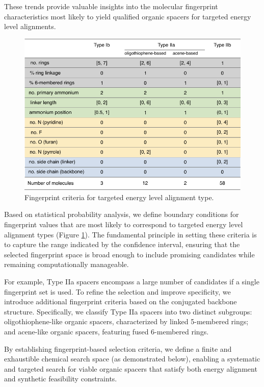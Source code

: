 These trends provide valuable insights into the molecular fingerprint characteristics most likely to yield qualified organic spacers for targeted energy level alignments.

\begin{figure}[htbp]
    \centering
    \includegraphics[width=\textwidth]{figures/synthesis-feasibility/figure5-12.pdf}
    \caption{Fingerprint criteria for targeted energy level alignment type.}
    \label{fig:figure5.12}
\end{figure}

Based on statistical probability analysis, we define boundary conditions for fingerprint values that are most likely to correspond to targeted energy level alignment types (Figure \ref{fig:figure5.12}). The fundamental principle in setting these criteria is to capture the range indicated by the confidence interval, ensuring that the selected fingerprint space is broad enough to include promising candidates while remaining computationally manageable.

For example, Type IIa spacers encompass a large number of candidates if a single fingerprint set is used. To refine the selection and improve specificity, we introduce additional fingerprint criteria based on the conjugated backbone structure. Specifically, we classify Type IIa spacers into two distinct subgroups: oligothiophene-like organic spacers, characterized by linked 5-membered rings; and acene-like organic spacers, featuring fused 6-membered rings.

By establishing fingerprint-based selection criteria, we define a finite and exhaustible chemical search space (as demonstrated below), enabling a systematic and targeted search for viable organic spacers that satisfy both energy alignment and synthetic feasibility constraints.

